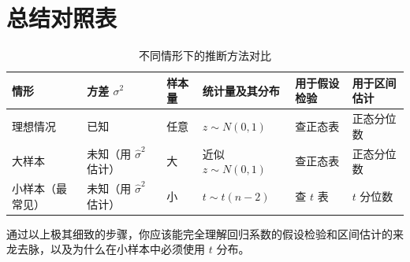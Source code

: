 \documentclass[12pt,a4paper]{ctexart}
\begin{document}
\section*{总结对照表}

\begin{table}[h]
\centering
\caption{不同情形下的推断方法对比}
\begin{tabular}{>{\raggedright\arraybackslash}p{2.5cm}>{\raggedright\arraybackslash}p{2.5cm}>{\raggedright\arraybackslash}p{2cm}>{\raggedright\arraybackslash}p{3cm}>{\raggedright\arraybackslash}p{2.5cm}>{\raggedright\arraybackslash}p{2.5cm}}
\toprule
\textbf{情形} & \textbf{方差 \(\sigma^2\)} & \textbf{样本量} & \textbf{统计量及其分布} & \textbf{用于假设检验} & \textbf{用于区间估计} \\
\midrule
理想情况 & 已知 & 任意 & \(z \sim N(0,1)\) & 查正态表 & 正态分位数 \\
大样本 & 未知（用 \(\hat{\sigma}^2\) 估计） & 大 & 近似 \(z \sim N(0,1)\) & 查正态表 & 正态分位数 \\
小样本（最常见） & 未知（用 \(\hat{\sigma}^2\) 估计） & 小 & \(t \sim t(n-2)\) & 查 \(t\) 表 & \(t\) 分位数 \\
\bottomrule
\end{tabular}
\end{table}

通过以上极其细致的步骤，你应该能完全理解回归系数的假设检验和区间估计的来龙去脉，以及为什么在小样本中必须使用 \(t\) 分布。
\end{document}
